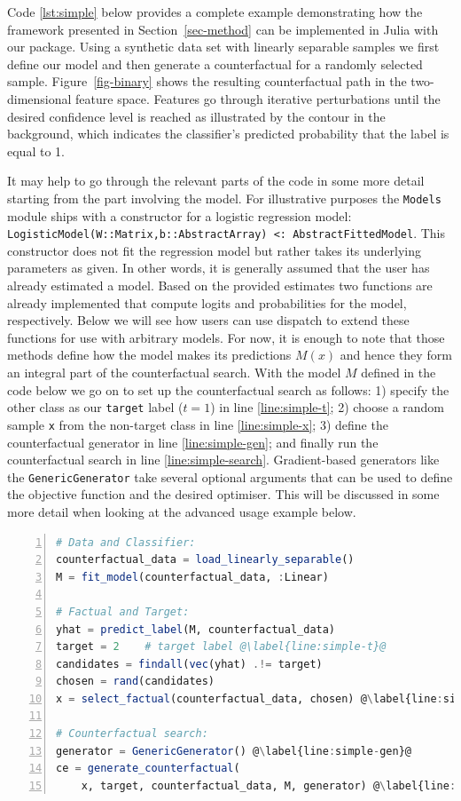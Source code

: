 \documentclass[
  letterpaper,
  DIV=11,
  numbers=noendperiod]{scrartcl}
\begin{document}
Code \ref{lst:simple} below provides a complete example demonstrating
how the framework presented in Section~\ref{sec-method} can be
implemented in Julia with our package. Using a synthetic data set with
linearly separable samples we first define our model and then generate a
counterfactual for a randomly selected sample. Figure~\ref{fig-binary}
shows the resulting counterfactual path in the two-dimensional feature
space. Features go through iterative perturbations until the desired
confidence level is reached as illustrated by the contour in the
background, which indicates the classifier's predicted probability that
the label is equal to 1.

It may help to go through the relevant parts of the code in some more
detail starting from the part involving the model. For illustrative
purposes the \texttt{Models} module ships with a constructor for a
logistic regression model:
\texttt{LogisticModel(W::Matrix,b::AbstractArray)\ \textless{}:\ AbstractFittedModel}.
This constructor does not fit the regression model but rather takes its
underlying parameters as given. In other words, it is generally assumed
that the user has already estimated a model. Based on the provided
estimates two functions are already implemented that compute logits and
probabilities for the model, respectively. Below we will see how users
can use dispatch to extend these functions for use with arbitrary
models. For now, it is enough to note that those methods define how the
model makes its predictions \(M(x)\) and hence they form an integral
part of the counterfactual search. With the model \(M\) defined in the
code below we go on to set up the counterfactual search as follows: 1)
specify the other class as our \texttt{target} label (\(t=1\)) in line
\ref{line:simple-t}; 2) choose a random sample \texttt{x} from the
non-target class in line \ref{line:simple-x}; 3) define the
counterfactual generator in line \ref{line:simple-gen}; and finally run
the counterfactual search in line \ref{line:simple-search}.
Gradient-based generators like the \texttt{GenericGenerator} take
several optional arguments that can be used to define the objective
function and the desired optimiser. This will be discussed in some more
detail when looking at the advanced usage example below.

\begin{lstlisting}[language=Julia, escapechar=@, numbers=left, label={lst:simple}, caption={Standard workflow for generating counterfactuals.}] 
# Data and Classifier:
counterfactual_data = load_linearly_separable()
M = fit_model(counterfactual_data, :Linear)

# Factual and Target:
yhat = predict_label(M, counterfactual_data)
target = 2    # target label @\label{line:simple-t}@
candidates = findall(vec(yhat) .!= target)
chosen = rand(candidates)
x = select_factual(counterfactual_data, chosen) @\label{line:simple-x}@

# Counterfactual search:
generator = GenericGenerator() @\label{line:simple-gen}@
ce = generate_counterfactual(
    x, target, counterfactual_data, M, generator) @\label{line:simple-search}@
\end{lstlisting}
\end{document}

